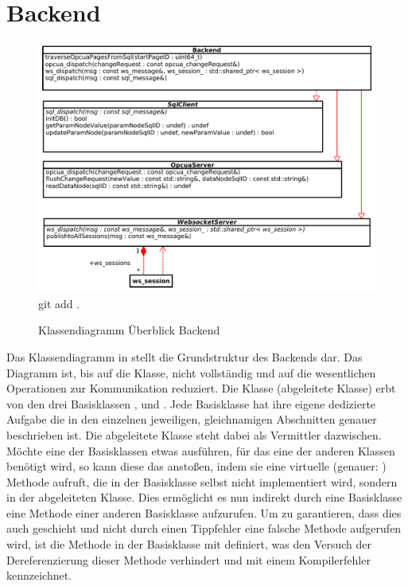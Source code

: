 \section{Backend}\label{sec:poc:backend}
\begin{figure}[ht]
  \centering
  \includegraphics[width=\textwidth]{content/hauptteil/umsetzungPoC/backend/uml/overview.pdf}
git add .
  \caption{Klassendiagramm Überblick Backend}
  \label{fig:backend:classDiag:overview}
\end{figure}
Das Klassendiagramm in  stellt die Grundstruktur des Backends dar. 
Das Diagramm ist, bis auf die  Klasse, nicht vollständig und auf die wesentlichen Operationen zur Kommunikation reduziert. 
Die  Klasse (abgeleitete Klasse) erbt von den drei Basisklassen ,  und .
Jede Basisklasse hat ihre eigene dedizierte Aufgabe die in den einzelnen jeweiligen, gleichnamigen Abschnitten genauer beschrieben ist.
Die abgeleitete Klasse steht dabei als Vermittler dazwischen. Möchte eine der Basisklassen etwas ausführen, für das eine der anderen Klassen benötigt wird, 
so kann diese das anstoßen, indem sie eine virtuelle (genauer: ) Methode aufruft, die in der Basisklasse selbst nicht implementiert wird, sondern in der abgeleiteten  Klasse.
Dies ermöglicht es nun indirekt durch eine Basisklasse eine Methode einer anderen Basisklasse aufzurufen.
Um zu garantieren, dass dies auch geschieht und nicht durch einen Tippfehler eine falsche Methode aufgerufen wird, 
ist die Methode in der Basisklasse mit  definiert, was den Versuch der Dereferenzierung dieser Methode verhindert und mit einem Kompilerfehler kennzeichnet.
